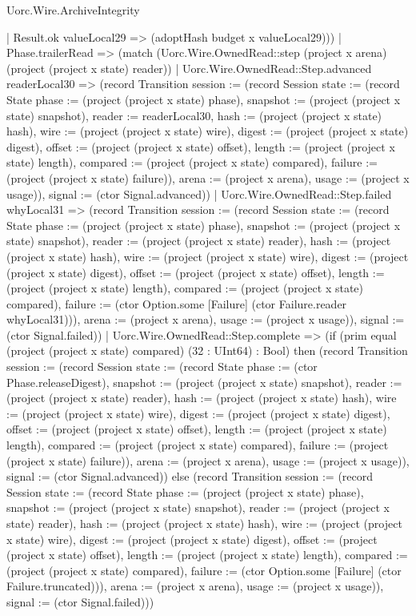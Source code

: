 \begin{lexlean}{Uorc.Wire.ArchiveIntegrity}
\begin{semanticmodule}
{          | Result.ok valueLocal29 => (adoptHash budget x valueLocal29)))
      | Phase.trailerRead => (match (Uorc.Wire.OwnedRead::step (project x arena) (project (project x state) reader))
        | Uorc.Wire.OwnedRead::Step.advanced readerLocal30 => (record Transition {session := (record Session {state := (record State {phase := (project (project x state) phase), snapshot := (project (project x state) snapshot), reader := readerLocal30, hash := (project (project x state) hash), wire := (project (project x state) wire), digest := (project (project x state) digest), offset := (project (project x state) offset), length := (project (project x state) length), compared := (project (project x state) compared), failure := (project (project x state) failure)}), arena := (project x arena), usage := (project x usage)}), signal := (ctor Signal.advanced)})
        | Uorc.Wire.OwnedRead::Step.failed whyLocal31 => (record Transition {session := (record Session {state := (record State {phase := (project (project x state) phase), snapshot := (project (project x state) snapshot), reader := (project (project x state) reader), hash := (project (project x state) hash), wire := (project (project x state) wire), digest := (project (project x state) digest), offset := (project (project x state) offset), length := (project (project x state) length), compared := (project (project x state) compared), failure := (ctor Option.some [Failure] (ctor Failure.reader whyLocal31))}), arena := (project x arena), usage := (project x usage)}), signal := (ctor Signal.failed)})
        | Uorc.Wire.OwnedRead::Step.complete => (if (prim equal (project (project x state) compared) (32 : UInt64) : Bool) then (record Transition {session := (record Session {state := (record State {phase := (ctor Phase.releaseDigest), snapshot := (project (project x state) snapshot), reader := (project (project x state) reader), hash := (project (project x state) hash), wire := (project (project x state) wire), digest := (project (project x state) digest), offset := (project (project x state) offset), length := (project (project x state) length), compared := (project (project x state) compared), failure := (project (project x state) failure)}), arena := (project x arena), usage := (project x usage)}), signal := (ctor Signal.advanced)}) else (record Transition {session := (record Session {state := (record State {phase := (project (project x state) phase), snapshot := (project (project x state) snapshot), reader := (project (project x state) reader), hash := (project (project x state) hash), wire := (project (project x state) wire), digest := (project (project x state) digest), offset := (project (project x state) offset), length := (project (project x state) length), compared := (project (project x state) compared), failure := (ctor Option.some [Failure] (ctor Failure.truncated))}), arena := (project x arena), usage := (project x usage)}), signal := (ctor Signal.failed)}))
}
\end{semanticmodule}
\end{lexlean}
